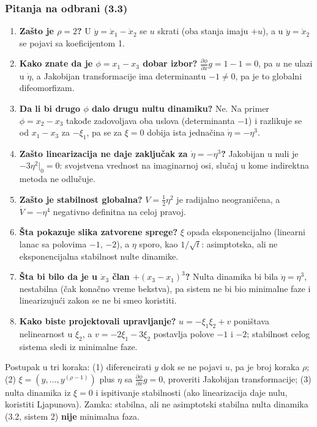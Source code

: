 \documentclass[11pt,a4paper,parskip=half,headsepline,numbers=noenddot]{scrartcl}
\begin{document}
\subsubsection{Pitanja na odbrani (3.3)}

\begin{enumerate}
\def\labelenumi{\arabic{enumi}.}
\item \textbf{Zašto je \(\rho = 2\)?} U \(\dot y = \dot x_1 - \dot x_2\) se \(u\) skrati (oba stanja imaju \(+u\)), a u \(\ddot y = \dot x_2\) se pojavi sa koeficijentom 1.
\item \textbf{Kako znate da je \(\phi = x_1 - x_3\) dobar izbor?} \(\frac{\partial\phi}{\partial x}g = 1 - 1 = 0\), pa \(u\) ne ulazi u \(\dot\eta\), a Jakobijan transformacije ima determinantu \(-1 \ne 0\), pa je to globalni difeomorfizam.
\item \textbf{Da li bi drugo \(\phi\) dalo drugu nultu dinamiku?} Ne. Na primer \(\phi = x_2 - x_3\) takođe zadovoljava oba uslova (determinanta \(-1\)) i razlikuje se od \(x_1 - x_3\) za \(-\xi_1\), pa se za \(\xi = 0\) dobija ista jednačina \(\dot\eta = -\eta^3\).
\item \textbf{Zašto linearizacija ne daje zaključak za \(\dot\eta = -\eta^3\)?} Jakobijan u nuli je \(-3\eta^2|_0 = 0\): svojstvena vrednost na imaginarnoj osi, slučaj u kome indirektna metoda ne odlučuje.
\item \textbf{Zašto je stabilnost globalna?} \(V = \frac12\eta^2\) je radijalno neograničena, a \(\dot V = -\eta^4\) negativno definitna na celoj pravoj.
\item \textbf{Šta pokazuje slika zatvorene sprege?} \(\xi\) opada eksponencijalno (linearni lanac sa polovima \(-1\), \(-2\)), a \(\eta\) sporo, kao \(1/\sqrt t\): asimptotska, ali ne eksponencijalna stabilnost nulte dinamike.
\item \textbf{Šta bi bilo da je u \(\dot x_3\) član \(+(x_3 - x_1)^3\)?} Nulta dinamika bi bila \(\dot\eta = \eta^3\), nestabilna (čak konačno vreme bekstva), pa sistem ne bi bio minimalne faze i linearizujući zakon se ne bi smeo koristiti.
\item \textbf{Kako biste projektovali upravljanje?} \(u = -\xi_1\xi_2 + v\) poništava nelinearnost u \(\dot\xi_2\), a \(v = -2\xi_1 - 3\xi_2\) postavlja polove \(-1\) i \(-2\); stabilnost celog sistema sledi iz minimalne faze.
\end{enumerate}

\begin{ispit}
Postupak u tri koraka: (1) diferencirati \(y\) dok se ne pojavi \(u\), pa je broj koraka \(\rho\); (2) \(\xi = (y, \dots, y^{(\rho-1)})\) plus \(\eta\) sa \(\frac{\partial\phi}{\partial x}g = 0\), proveriti Jakobijan transformacije; (3) nulta dinamika iz \(\xi = 0\) i ispitivanje stabilnosti (ako linearizacija daje nulu, koristiti Ljapunova). Zamka: stabilna, ali ne asimptotski stabilna nulta dinamika (3.2, sistem 2) \textbf{nije} minimalna faza.
\end{ispit}
\end{document}
